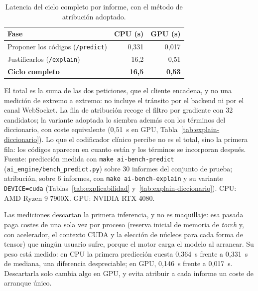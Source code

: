 \begin{table}[h]
\centering
\small
\caption[Latencia del ciclo completo por informe, con el método de atribución adoptado]{Latencia del ciclo completo por informe, con el método de atribución adoptado.}
\label{tab:latencia}
\begin{tabular}{lrr}
\hline
\textbf{Fase} & \textbf{CPU (s)} & \textbf{GPU (s)} \\
\hline
Proponer los códigos (\texttt{/predict})   & 0{,}331 & 0{,}017 \\
Justificarlos (\texttt{/explain})          & 16{,}2  & 0{,}51  \\
\hline
\textbf{Ciclo completo}                    & \textbf{16{,}5} & \textbf{0{,}53} \\
\hline
\end{tabular}

\vspace{2mm}
{\footnotesize El total es la suma de las dos peticiones, que el cliente encadena, y no una medición de extremo a extremo: no incluye el tránsito por el backend ni por el canal WebSocket. La fila de atribución recoge el filtro por gradiente con 32 candidatos; la variante adoptada lo siembra además con los términos del diccionario, con coste equivalente (0{,}51~s en GPU, Tabla~\ref{tab:explain-diccionario}). Lo que el codificador clínico percibe no es el total, sino la primera fila: los códigos aparecen en cuanto están y los términos se incorporan después.}
\vspace{1mm}
{\footnotesize Fuente: predicción medida con \texttt{make ai-bench-predict} (\texttt{ai\_engine/bench\_predict.py}) sobre 30 informes del conjunto de prueba; atribución, sobre 6 informes, con \texttt{make ai-bench-explain} y su variante \texttt{DEVICE=cuda} (Tablas~\ref{tab:explicabilidad} y~\ref{tab:explain-diccionario}). CPU: AMD Ryzen 9 7900X. GPU: NVIDIA RTX 4080.}
\end{table}

Las mediciones descartan la primera inferencia, y no es maquillaje: esa pasada paga costes de una sola vez por proceso (reserva inicial de memoria de \emph{torch} y, con acelerador, el contexto CUDA y la elección de núcleos para cada forma de tensor) que ningún usuario sufre, porque el motor carga el modelo al arrancar. Su peso está medido: en CPU la primera predicción cuesta 0{,}364~s frente a 0{,}331~s de mediana, una diferencia despreciable; en GPU, 0{,}146~s frente a 0{,}017~s. Descartarla solo cambia algo en GPU, y evita atribuir a cada informe un coste de arranque único.

